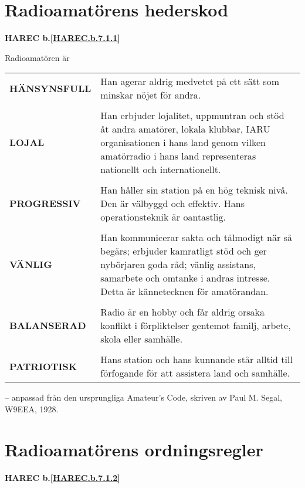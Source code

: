 \section[Hederskod]{Radioamatörens hederskod}
\textbf{HAREC
  b.\ref{HAREC.b.7.1.1}\label{myHAREC.b.7.1.1}
}

Radioamatören är

\begin{tabular}{lp{9cm}}
  \textbf{HÄNSYNSFULL} &
     Han agerar aldrig medvetet på ett sätt som minskar nöjet för andra. \\
  & \\

  \textbf{LOJAL} &
  Han erbjuder lojalitet, uppmuntran och stöd åt andra amatörer, lokala klubbar,
  IARU organisationen i hans land genom vilken amatörradio i hans land
  representeras nationellt och internationellt.\\
  & \\

  \textbf{PROGRESSIV} &
  Han håller sin station på en hög teknisk nivå.
  Den är välbyggd och effektiv.
  Hans operationsteknik är oantastlig.\\
  & \\

  \textbf{VÄNLIG} &
  Han kommunicerar sakta och tålmodigt när så begärs;
  erbjuder kamratligt stöd och ger nybörjaren goda råd;
  vänlig assistans, samarbete och omtanke i andras intresse.
  Detta är kännetecknen för amatörandan.\\
  & \\

  \textbf{BALANSERAD} &
  Radio är en hobby och får aldrig orsaka konflikt i förpliktelser gentemot
  familj, arbete, skola eller samhälle.\\
  & \\

  \textbf{PATRIOTISK} &
  Hans station och hans kunnande står alltid till förfogande för att
  assistera land och samhälle.\\
\end{tabular}

-- anpassad från den ursprungliga Amateur's Code, skriven av Paul M. Segal, W9EEA, 1928.

\section[Ordningsregler]{Radioamatörens ordningsregler}
\textbf{HAREC
  b.\ref{HAREC.b.7.1.2}\label{myHAREC.b.7.1.2}
}

